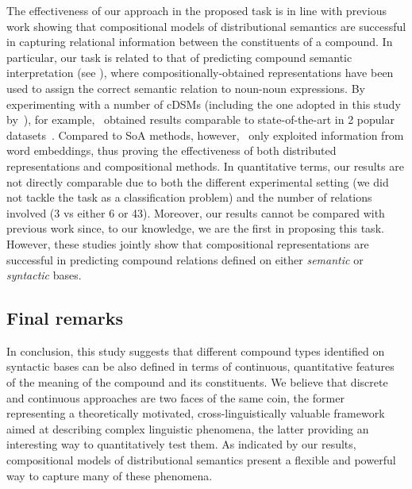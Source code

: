 \documentclass[output=paper]{langsci/langscibook}
\begin{document}
The effectiveness of our approach in the proposed task is in line with previous work showing that compositional models of distributional semantics are successful in capturing relational information between the constituents of a compound. In particular, our task is related to that of predicting compound semantic interpretation (see ), where compositionally-obtained representations have been used to assign the correct semantic relation to noun-noun expressions. By experimenting with a number of cDSMs (including the one adopted in this study by~\citealt{guevara2010}), for example,~\cite{dima2016compositionality} obtained results comparable to state-of-the-art in 2 popular datasets~\citep{o2007annotating,tratz2010taxonomy}. Compared to SoA methods, however,~\cite{dima2016compositionality} only exploited information from word embeddings, thus proving the effectiveness of both distributed representations and compositional methods. In quantitative terms, our results are not directly comparable due to both the different experimental setting (we did not tackle the task as a classification problem) and the number of relations involved (3 vs either 6 or 43). Moreover, our results cannot be compared with previous work since, to our knowledge, we are the first in proposing this task. However, these studies jointly show that compositional  representations are successful in predicting compound relations defined on either \emph{semantic} or \emph{syntactic} bases.


\subsection{Final remarks}

In conclusion, this study suggests that different compound types identified on syntactic bases can be also defined in terms of continuous, quantitative features of the meaning of the compound and its constituents. We believe that discrete and continuous approaches are two faces of the same coin, the former representing a theoretically motivated, cross-linguistically valuable framework aimed at describing complex linguistic phenomena, the latter providing an interesting way to quantitatively test them. As indicated by our results, compositional models of distributional semantics present a flexible and powerful way to capture many of these phenomena.

\end{document}
